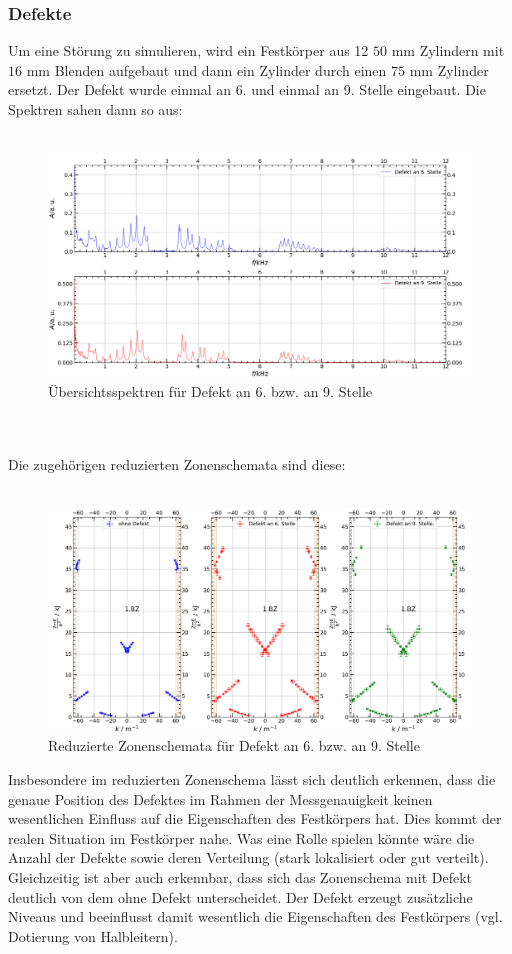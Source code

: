 \documentclass[german,  %
parskip=full,  %
]{scrartcl}
\begin{document}
\subsubsection{Defekte}
Um eine Störung zu simulieren, wird ein Festkörper aus 12 $50$ mm Zylindern mit $16$ mm Blenden aufgebaut und dann ein Zylinder durch einen $75$ mm Zylinder ersetzt. Der Defekt wurde einmal an 6. und einmal an 9. Stelle eingebaut. Die Spektren sahen dann so aus:
\\\\
\begin{figure}[h!]
\centering
\includegraphics[width=\textwidth]{4641_und_4642_Uebersichtssprektren.png}
\caption{Übersichtsspektren für Defekt an 6. bzw. an 9. Stelle}
\end{figure}
\\\\
Die zugehörigen reduzierten Zonenschemata sind diese:
\\\\
\begin{figure}[h!]
\centering
\includegraphics[width=\textwidth]{4641_und_4642_reduziertes_Zonenschema.png}
\caption{Reduzierte Zonenschemata für Defekt an 6. bzw. an 9. Stelle}
\end{figure}
Insbesondere im reduzierten Zonenschema lässt sich deutlich erkennen, dass die genaue Position des Defektes im Rahmen der Messgenauigkeit keinen wesentlichen Einfluss auf die Eigenschaften des Festkörpers hat. Dies kommt der realen Situation im Festkörper nahe. Was eine Rolle spielen könnte wäre die Anzahl der Defekte sowie deren Verteilung (stark lokalisiert oder gut verteilt). Gleichzeitig ist aber auch erkennbar, dass sich das Zonenschema mit Defekt deutlich von dem ohne Defekt unterscheidet. Der Defekt erzeugt zusätzliche Niveaus und beeinflusst damit wesentlich die Eigenschaften des Festkörpers (vgl. Dotierung von Halbleitern).
\end{document}
